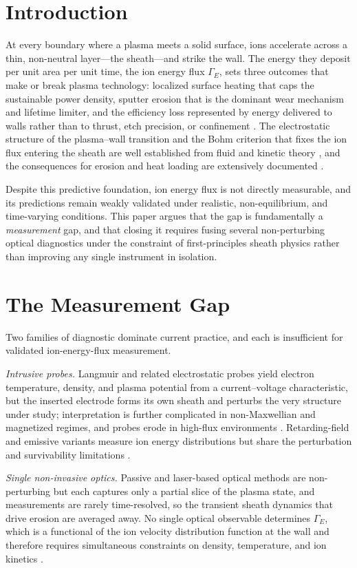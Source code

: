 \documentclass[conference]{IEEEtran}
\newcommand{\GammaE}{\Gamma_{E}}
\begin{document}
\section{Introduction}
At every boundary where a plasma meets a solid surface, ions accelerate across a thin, non-neutral layer---the sheath---and strike the wall. The energy they deposit per unit area per unit time, the ion energy flux $\GammaE$, sets three outcomes that make or break plasma technology: localized surface heating that caps the sustainable power density, sputter erosion that is the dominant wear mechanism and lifetime limiter, and the efficiency loss represented by energy delivered to walls rather than to thrust, etch precision, or confinement \cite{ref0001,ref0074}. The electrostatic structure of the plasma--wall transition and the Bohm criterion that fixes the ion flux entering the sheath are well established from fluid and kinetic theory \cite{ref0001,ref0166,ref0659}, and the consequences for erosion and heat loading are extensively documented \cite{ref0134,ref0562}.

Despite this predictive foundation, ion energy flux is not directly measurable, and its predictions remain weakly validated under realistic, non-equilibrium, and time-varying conditions. This paper argues that the gap is fundamentally a \emph{measurement} gap, and that closing it requires fusing several non-perturbing optical diagnostics under the constraint of first-principles sheath physics rather than improving any single instrument in isolation.

\section{The Measurement Gap}
Two families of diagnostic dominate current practice, and each is insufficient for validated ion-energy-flux measurement.

\emph{Intrusive probes.} Langmuir and related electrostatic probes yield electron temperature, density, and plasma potential from a current--voltage characteristic, but the inserted electrode forms its own sheath and perturbs the very structure under study; interpretation is further complicated in non-Maxwellian and magnetized regimes, and probes erode in high-flux environments \cite{ref0194,ref0195}. Retarding-field and emissive variants measure ion energy distributions but share the perturbation and survivability limitations \cite{ref0107}.

\emph{Single non-invasive optics.} Passive and laser-based optical methods are non-perturbing but each captures only a partial slice of the plasma state, and measurements are rarely time-resolved, so the transient sheath dynamics that drive erosion are averaged away. No single optical observable determines $\GammaE$, which is a functional of the ion velocity distribution function at the wall and therefore requires simultaneous constraints on density, temperature, and ion kinetics \cite{ref0074,ref0075}.
\end{document}

